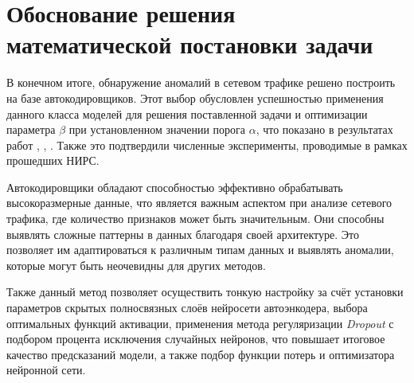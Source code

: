 \section{Обоснование решения математической постановки задачи}

В конечном итоге, обнаружение аномалий в сетевом трафике решено построить на базе автокодировщиков. Этот выбор обусловлен успешностью применения данного класса моделей для решения поставленной задачи и оптимизации параметра $\beta$ при установленном значении порога $\alpha$, что показано в результатах работ \cite{Gurina2019AnomalyBasedMF}, \cite{Applied-Autoencoder-One}, \cite{Applied-Autoencoder-Two}. Также это подтвердили численные эксперименты, проводимые в рамках прошедших НИРС.

Автокодировщики обладают способностью эффективно обрабатывать высокоразмерные данные, что является важным аспектом при анализе сетевого трафика, где количество признаков может быть значительным. Они способны выявлять сложные паттерны в данных благодаря своей архитектуре. Это позволяет им адаптироваться к различным типам данных и выявлять аномалии, которые могут быть неочевидны для других методов.

Также данный метод позволяет осуществить тонкую настройку за счёт установки параметров скрытых полносвязных слоёв нейросети автоэнкодера, выбора оптимальных функций активации, применения метода регуляризации \textit{Dropout} с подбором процента исключения случайных нейронов, что повышает итоговое качество предсказаний модели, а также подбор функции потерь и оптимизатора нейронной сети. 